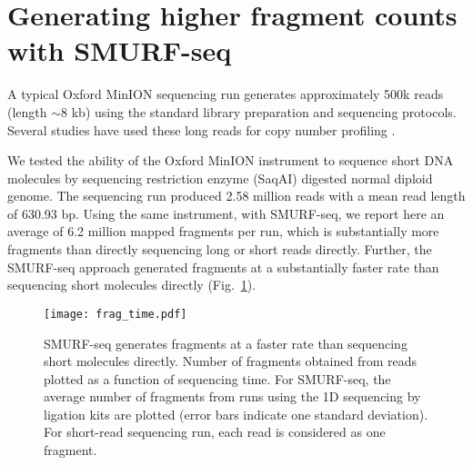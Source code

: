 \section{Generating higher fragment counts with SMURF-seq}
A typical Oxford MinION sequencing run generates approximately 500k
reads (length $\sim$8 kb) \citep{jain2018nanopore,tyson2018minion} using
the standard library preparation and sequencing protocols. Several
studies have used these long reads for copy number profiling
\citep{euskirchen2017same,magi2019nano}.

We tested the ability of the Oxford MinION instrument to sequence short
DNA molecules by sequencing restriction enzyme (SaqAI) digested normal
diploid genome.  The sequencing run produced 2.58 million reads with a
mean read length of 630.93 bp.
Using the same instrument, with SMURF-seq, we report here an average of
6.2 million mapped fragments per run, which is substantially more
fragments than directly sequencing long or short reads directly.
Further, the SMURF-seq approach generated fragments at a substantially
faster rate than sequencing short molecules directly
(Fig.~\ref{frag_time}).

\begin{figure}[t!]
\centering
\texttt{[image: frag\_time.pdf]}
\caption[SMURF-seq generates fragments at a faster rate than
  sequencing short molecules directly.]{
  SMURF-seq generates fragments at a faster rate than sequencing
  short molecules directly. Number of fragments obtained from reads
  plotted as a function of  sequencing time. For SMURF-seq, the average
  number of fragments from runs using the 1D sequencing by ligation kits
  are plotted (error bars indicate one standard deviation). For short-read
  sequencing run, each read is considered as one fragment.}
\label{frag_time}
\end{figure}

